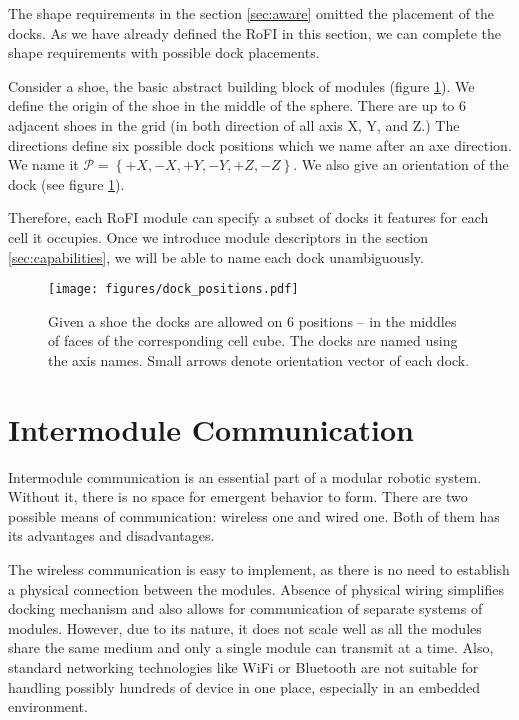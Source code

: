 The shape requirements in the section \ref{sec:aware} omitted the placement of
the docks. As we have already defined the RoFI in this section, we can complete
the shape requirements with possible dock placements.

Consider a shoe, the basic abstract building block of modules (figure
\ref{fig:dock_positions}). We define the origin of the shoe in the middle of the
sphere. There are up to 6 adjacent shoes in the grid (in both direction of all
axis X, Y, and Z.) The directions define six possible dock positions which we
name after an axe direction. We name it $\mathcal{P} = \left\{+X, -X, +Y, -Y,
+Z, -Z\right\}$. We also give an orientation of the dock (see figure
\ref{fig:dock_positions}).

Therefore, each RoFI module can specify a subset of docks it features for each
cell it occupies. Once we introduce module descriptors in the section
\ref{sec:capabilities}, we will be able to name each dock unambiguously.

\begin{figure}[t]
    \centering
    \texttt{[image: figures/dock\_positions.pdf]}
    \caption{Given a shoe the docks are allowed on 6 positions -- in the
    middles of faces of the corresponding cell cube. The docks are named using
    the axis names. Small arrows denote orientation vector of each dock.}
    \label{fig:dock_positions}
\end{figure}

\section{Intermodule Communication}\label{sec:communication}

Intermodule communication is an essential part of a modular robotic system.
Without it, there is no space for emergent behavior to form. There are two
possible means of communication: wireless one and wired one. Both of them
has its advantages and disadvantages.

The wireless communication is easy to implement, as there is no need to
establish a physical connection between the modules. Absence of physical wiring
simplifies docking mechanism and also allows for communication of separate
systems of modules. However, due to its nature, it does not scale well as all
the modules share the same medium and only a single module can transmit at a
time. Also, standard networking technologies like WiFi or Bluetooth are not
suitable for handling possibly hundreds of device in one place, especially in
an embedded environment.

